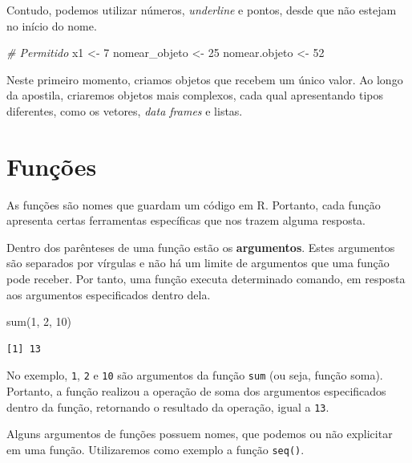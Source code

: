 \documentclass[
  brazilian,
]{book}
\newenvironment{Shaded}{\begin{snugshade}}{\end{snugshade}}
\newcommand{\CommentTok}[1]{\textcolor[rgb]{0.56,0.35,0.01}{\textit{#1}}}
\newcommand{\DecValTok}[1]{\textcolor[rgb]{0.00,0.00,0.81}{#1}}
\newcommand{\FunctionTok}[1]{\textcolor[rgb]{0.00,0.00,0.00}{#1}}
\newcommand{\NormalTok}[1]{#1}
\newcommand{\OtherTok}[1]{\textcolor[rgb]{0.56,0.35,0.01}{#1}}
\begin{document}
Contudo, podemos utilizar números, \emph{underline} e pontos, desde que não estejam no início do nome.

\begin{Shaded}
\begin{Highlighting}[]
\CommentTok{\# Permitido}
\NormalTok{x1 }\OtherTok{\textless{}{-}} \DecValTok{7}
\NormalTok{nomear\_objeto }\OtherTok{\textless{}{-}} \DecValTok{25}
\NormalTok{nomear.objeto }\OtherTok{\textless{}{-}} \DecValTok{52}
\end{Highlighting}
\end{Shaded}

Neste primeiro momento, criamos objetos que recebem um único valor. Ao longo da apostila, criaremos objetos mais complexos, cada qual apresentando tipos diferentes, como os vetores, \emph{data frames} e listas.

\hypertarget{funuxe7uxf5es}{%
\section{Funções}\label{funuxe7uxf5es}}

As funções são nomes que guardam um código em R. Portanto, cada função apresenta certas ferramentas específicas que nos trazem alguma resposta.

Dentro dos parênteses de uma função estão os \textbf{argumentos}. Estes argumentos são separados por vírgulas e não há um limite de argumentos que uma função pode receber. Por tanto, uma função executa determinado comando, em resposta aos argumentos especificados dentro dela.

\begin{Shaded}
\begin{Highlighting}[]
\FunctionTok{sum}\NormalTok{(}\DecValTok{1}\NormalTok{, }\DecValTok{2}\NormalTok{, }\DecValTok{10}\NormalTok{)}
\end{Highlighting}
\end{Shaded}

\begin{verbatim}
[1] 13
\end{verbatim}

No exemplo, \texttt{1}, \texttt{2} e \texttt{10} são argumentos da função \texttt{sum} (ou seja, função soma). Portanto, a função realizou a operação de soma dos argumentos especificados dentro da função, retornando o resultado da operação, igual a \texttt{13}.

Alguns argumentos de funções possuem nomes, que podemos ou não explicitar em uma função. Utilizaremos como exemplo a função \texttt{seq()}.
\end{document}
